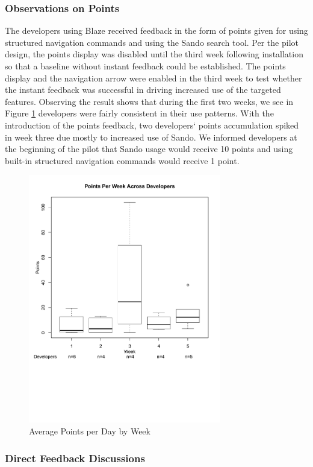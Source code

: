 \documentclass{sig-alternate}
\begin{document}
\subsubsection{Observations on Points}

The developers using Blaze received feedback in the form of points given for using structured navigation commands and using the Sando search tool\cite{Shepherd2012Sando}.  Per the pilot design, the points display was disabled until the third week following installation so that a baseline without instant feedback could be established.  The points display and the navigation arrow were enabled in the third week to test whether the instant feedback was successful in driving increased use of the targeted features.  Observing the result shows that during the first two weeks, we see in Figure \ref{fig:pointsbyweek} developers were fairly consistent in their use patterns.  With the introduction of the points feedback, two developers` points accumulation spiked in week three due mostly to increased use of Sando.   We informed developers at the beginning of the pilot that Sando usage would receive 10 points and using built-in structured navigation commands would receive 1 point.

\begin{figure}
	\includegraphics[width=3.3in]{pointsbyweek_ann.pdf}
	\caption{Average Points per Day by Week}
	\label{fig:pointsbyweek}
\end{figure}

\subsubsection{Direct Feedback Discussions}
\end{document}
